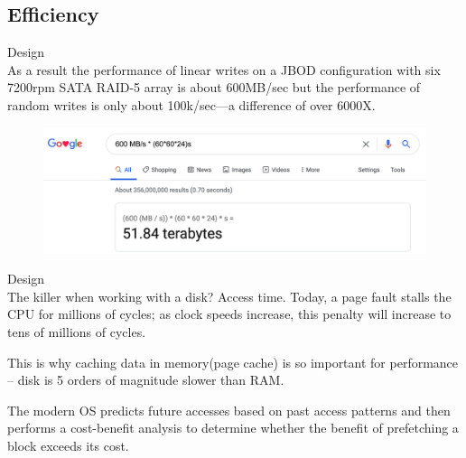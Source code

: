 \subsection{Efficiency}
\begin{frame}[plain,t]{Design} %
     \\
    \vspace{2ex}
   As a result the performance of linear writes on a JBOD configuration with six 7200rpm SATA RAID-5 array is about 600MB/sec but the performance of random writes is only about 100k/sec—a difference of over 6000X. 
   
   \vspace{2ex}
   \begin{figure}
       \centering
       \includegraphics[width=0.9\linewidth]{image/0213}
       \label{fig:0213}
   \end{figure}
   
   
   
    
    
\end{frame}
\begin{frame}[plain,t]{Design} %
     \\
    \vspace{2ex}
The killer when working with a disk? Access time. Today, a page fault stalls the CPU for millions of cycles; as clock speeds increase, this penalty will increase to tens of millions of cycles.

 \vspace{2ex}
 This is why caching data in memory({\color{red}page cache}) is so important for performance – disk is 5 orders of magnitude slower than RAM.


   \vspace{2ex}
     The modern OS predicts future accesses based on past access patterns and then performs a cost-benefit analysis to determine whether the benefit of prefetching a block exceeds its cost.
    

    
    
\end{frame}
